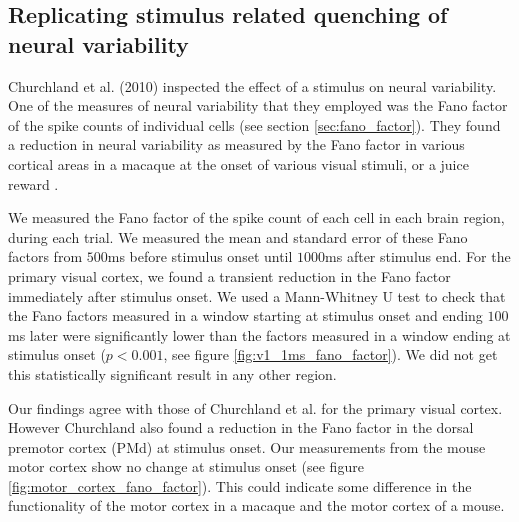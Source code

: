   \subsection{Replicating stimulus related quenching of neural variability}
  Churchland et al. (2010) inspected the effect of a stimulus on neural variability. One of the measures of neural variability that they employed was the Fano factor of the spike counts of individual cells (see section \ref{sec:fano_factor}). They found a reduction in neural variability as measured by the Fano factor in various cortical areas in a macaque at the onset of various visual stimuli, or a juice reward \parencite{churchland}.

  We measured the Fano factor of the spike count of each cell in each brain region, during each trial. We measured the mean and standard error of these Fano factors from $500$ms before stimulus onset until $1000$ms after stimulus end. For the primary visual cortex, we found a transient reduction in the Fano factor immediately after stimulus onset. We used a Mann-Whitney U test to check that the Fano factors measured in a window starting at stimulus onset and ending $100$ms later were significantly lower than the factors measured in a window ending at stimulus onset ($p < 0.001$, see figure \ref{fig:v1_1ms_fano_factor}). We did not get this statistically significant result in any other region.

  Our findings agree with those of Churchland et al. for the primary visual cortex. However Churchland also found a reduction in the Fano factor in the dorsal premotor cortex (PMd) at stimulus onset. Our measurements from the mouse motor cortex show no change at stimulus onset (see figure \ref{fig:motor_cortex_fano_factor}). This could indicate some difference in the functionality of the motor cortex in a macaque and the motor cortex of a mouse.

